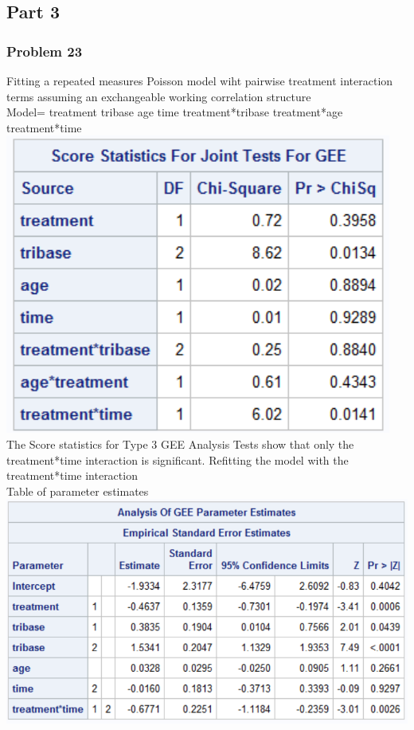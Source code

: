 \documentclass{article}
\begin{document}
\begin{flushleft}
\part*{Part 3}
\section*{Problem 23}
Fitting a repeated measures Poisson model wiht pairwise treatment interaction terms assuming an exchangeable working correlation structure\\
Model= treatment tribase age time treatment*tribase treatment*age treatment*time\\
\includegraphics[scale=.6]{score3.png}\\
The Score statistics for Type 3 GEE Analysis Tests show that only the treatment*time interaction is significant.
Refitting the model with the treatment*time interaction\\
Table of parameter estimates\\
\includegraphics[scale=.6]{gee.png}\\
\pagebreak

\end{flushleft}
\end{document}
